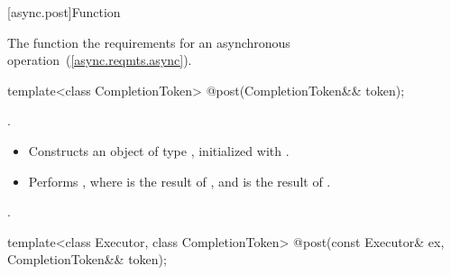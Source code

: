 [async.post]{Function }

%
\pnum
\begin{note} The function   the requirements for an asynchronous operation~(\ref{async.reqmts.async}). \end{note}

\begin{itemdecl}
template<class CompletionToken>
  @\DEDUCED@ post(CompletionToken&& token);
\end{itemdecl}

\begin{itemdescr}
\pnum
\completionsig {}.

\pnum
\effects
\begin{itemize}
\item
 Constructs an object  of type , initialized with .
\item
 Performs , where  is the result of , and  is the result of .
\end{itemize}

\pnum
\returns {}.
\end{itemdescr}

\begin{itemdecl}
template<class Executor, class CompletionToken>
  @\DEDUCED@ post(const Executor& ex, CompletionToken&& token);
\end{itemdecl}

